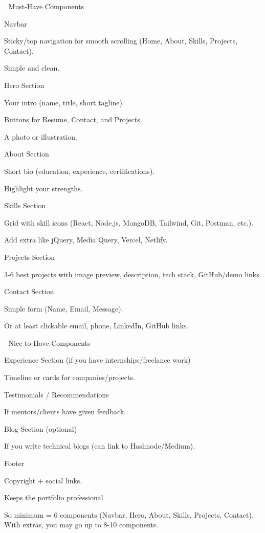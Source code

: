 🔹 Must-Have Components

Navbar

Sticky/top navigation for smooth scrolling (Home, About, Skills, Projects, Contact).

Simple and clean.

Hero Section

Your intro (name, title, short tagline).

Buttons for Resume, Contact, and Projects.

A photo or illustration.

About Section

Short bio (education, experience, certifications).

Highlight your strengths.

Skills Section

Grid with skill icons (React, Node.js, MongoDB, Tailwind, Git, Postman, etc.).

Add extra like jQuery, Media Query, Vercel, Netlify.

Projects Section

3-6 best projects with image preview, description, tech stack, GitHub/demo links.

Contact Section

Simple form (Name, Email, Message).

Or at least clickable email, phone, LinkedIn, GitHub links.

🔹 Nice-to-Have Components

Experience Section (if you have internships/freelance work)

Timeline or cards for companies/projects.

Testimonials / Recommendations

If mentors/clients have given feedback.

Blog Section (optional)

If you write technical blogs (can link to Hashnode/Medium).

Footer

Copyright + social links.

Keeps  the portfolio professional.

 So minimum = 6 components (Navbar, Hero, About, Skills, Projects, Contact).
 With extras, you may go up to 8-10 components.
